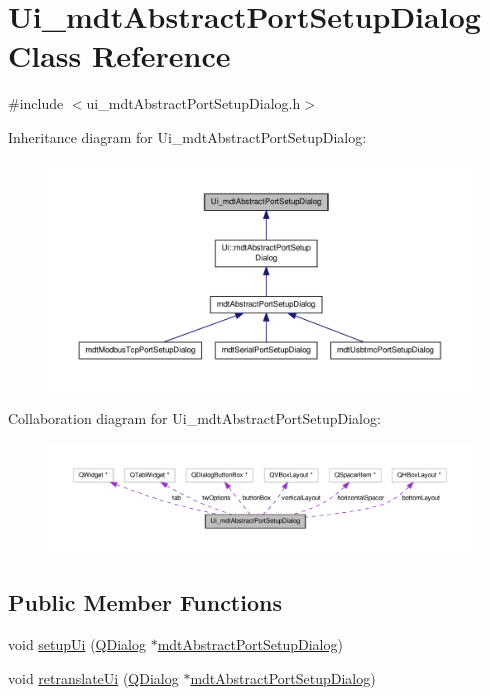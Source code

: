 \hypertarget{class_ui__mdt_abstract_port_setup_dialog}{\section{Ui\-\_\-mdt\-Abstract\-Port\-Setup\-Dialog Class Reference}
\label{class_ui__mdt_abstract_port_setup_dialog}
}


{\ttfamily \#include $<$ui\-\_\-mdt\-Abstract\-Port\-Setup\-Dialog.\-h$>$}



Inheritance diagram for Ui\-\_\-mdt\-Abstract\-Port\-Setup\-Dialog\-:\nopagebreak
\begin{figure}[H]
\begin{center}
\leavevmode
\includegraphics[width=350pt]{class_ui__mdt_abstract_port_setup_dialog__inherit__graph}
\end{center}
\end{figure}


Collaboration diagram for Ui\-\_\-mdt\-Abstract\-Port\-Setup\-Dialog\-:\nopagebreak
\begin{figure}[H]
\begin{center}
\leavevmode
\includegraphics[width=350pt]{class_ui__mdt_abstract_port_setup_dialog__coll__graph}
\end{center}
\end{figure}
\subsection*{Public Member Functions}
\begin{DoxyCompactItemize}
\item 
void \hyperlink{class_ui__mdt_abstract_port_setup_dialog_a5b5b735fa4c40a033a360f4311e193e5}{setup\-Ui} (\hyperlink{class_q_dialog}{Q\-Dialog} $\ast$\hyperlink{classmdt_abstract_port_setup_dialog}{mdt\-Abstract\-Port\-Setup\-Dialog})
\item 
void \hyperlink{class_ui__mdt_abstract_port_setup_dialog_ad28958e37ce2490217af7b0c5f02490e}{retranslate\-Ui} (\hyperlink{class_q_dialog}{Q\-Dialog} $\ast$\hyperlink{classmdt_abstract_port_setup_dialog}{mdt\-Abstract\-Port\-Setup\-Dialog})
\end{DoxyCompactItemize}
